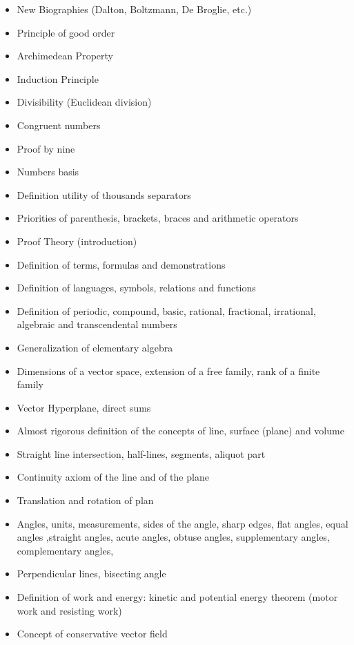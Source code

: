 \begin{itemize}
			\begin{itemize}[noitemsep]
				\item New Biographies (Dalton, Boltzmann, De Broglie, etc.)
				\item Principle of good order
				\item Archimedean Property
				\item Induction Principle
				\item Divisibility (Euclidean division)
				\item Congruent numbers
				\item Proof by nine
				\item Numbers basis
				\item Definition utility of thousands separators
				\item Priorities of parenthesis, brackets, braces and arithmetic operators
				\item Proof Theory (introduction)
				\item Definition of terms, formulas and demonstrations
				\item Definition of languages, symbols, relations and functions
				\item Definition of periodic, compound, basic, rational, fractional, irrational, algebraic and transcendental numbers
				\item Generalization of elementary algebra
				\item Dimensions of a vector space, extension of a free family, rank of a finite family
				\item Vector Hyperplane, direct sums
				\item Almost rigorous definition of the concepts of line, surface (plane) and volume
				\item Straight line intersection, half-lines, segments, aliquot part
				\item Continuity axiom of the line and of the plane
				\item Translation and rotation of plan
				\item Angles, units, measurements, sides of the angle, sharp edges, flat angles, equal angles ,straight angles, acute angles, obtuse angles, supplementary angles, complementary angles, 
				\item Perpendicular lines, bisecting angle
				\item Definition of work and energy: kinetic and potential energy theorem (motor work and resisting work)
				\item Concept of conservative vector field

\end{itemize}
\end{itemize}
